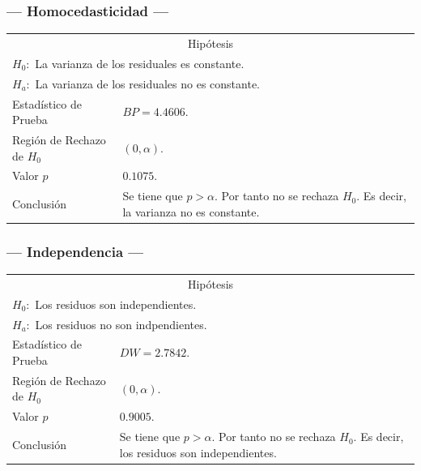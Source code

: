 \subsubsection{--- Homocedasticidad ---} %
\begin{center}
  \begin{tabular}{|l|p{8cm}|}
    \cline{1-2}
    \multicolumn{2}{|c|}{Hipótesis}\\ \cline{1-2}
    \multicolumn{2}{|l|}{\(H_0:\) La varianza de los residuales es constante.} \\ 
    \multicolumn{2}{|l|}{\(H_a:\) La varianza de los residuales no es constante.} \\ \cline{1-2}
    Estadístico de Prueba & \(BP = 4.4606\).\\ \cline{1-2} 
		Región de Rechazo de \(H_0\) & \((0, \alpha )\).\\ \cline{1-2} 
    Valor \(p\) & \(0.1075\).\\ \cline{1-2} 
    Conclusión & Se tiene que \(p> \alpha\). \newline 
		Por tanto no se rechaza \(H_0\). \newline 
		Es decir, la varianza no es constante. \\ \cline{1-2} 
  \end{tabular}
\end{center}

\subsubsection{--- Independencia ---} %
\begin{center}
  \begin{tabular}{|l|p{8cm}|}
    \cline{1-2}
    \multicolumn{2}{|c|}{Hipótesis}\\ \cline{1-2}
    \multicolumn{2}{|l|}{\(H_0:\) Los residuos son independientes.} \\ 
    \multicolumn{2}{|l|}{\(H_a:\) Los residuos no son indpendientes.} \\ \cline{1-2}
    Estadístico de Prueba & \(DW = 2.7842\).\\ \cline{1-2} 
		Región de Rechazo de \(H_0\) & \((0, \alpha )\).\\ \cline{1-2} 
    Valor \(p\) & \(0.9005\).\\ \cline{1-2} 
    Conclusión & Se tiene que \(p> \alpha\). \newline 
		Por tanto no se rechaza \(H_0\). \newline 
		Es decir, los residuos son independientes.\\ \cline{1-2} 
  \end{tabular}
\end{center}

